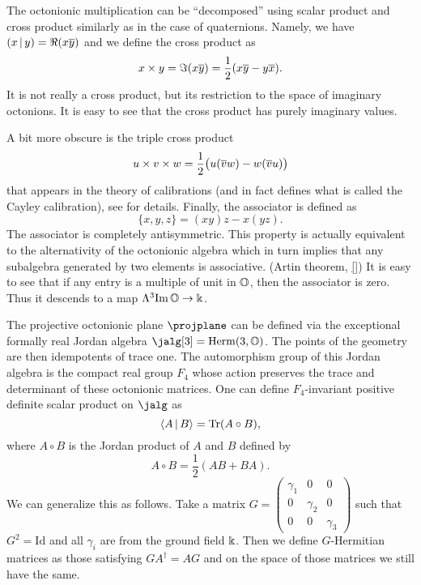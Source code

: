 The octonionic multiplication  can be ``decomposed'' using scalar product and cross product similarly  as in the case of quaternions. Namely, we have $\left( x \,|\, y \right) = \Re( x\overline{y})$ and we define the cross product as \[x \times y = \Im (x\overline{y}) = \frac{1}{2}( x\overline{y} - y\overline{x}).\] It is not really a cross product, but its restriction to the space of imaginary octonions. It is easy to see that the cross product has purely imaginary values.


A bit more obscure is the triple cross product 
\[
u \times v \times w = \frac{1}{2}\bigl( u(\overline{v}w) - w(\overline{v}u) \bigr)
\]
that appears in the theory of calibrations (and in fact defines what is called the Cayley calibration), see \cite{harvey, salamon} for details. Finally, the associator is defined as
\[
\{ x,y,z \} = (xy)z - x(yz).
\]
The associator is completely antisymmetric. This property is actually equivalent to the alternativity of the octonionic algebra which in turn implies that any subalgebra generated by two elements is associative. (Artin theorem, \ref{}) It is easy to see that if any entry is a multiple of unit in $\mathbb{O}$, then the associator is zero. Thus it descends to a map $\Lambda^3 \mathrm{Im}\, \mathbb{O} \to \Bbbk$.

The projective octonionic plane $\projplane$ can be defined via the exceptional formally real Jordan algebra $\jalg[3] = \mathrm{Herm}(3,\octo)$. The points of the geometry are then idempotents of trace one. The automorphism group of this Jordan algebra is the compact real group $F_4$ whose action preserves the trace and determinant of these octonionic matrices. One can define $F_4$-invariant positive definite scalar product on $\jalg$ as
\[
 \langle A\,|\, B \rangle = \mathrm{Tr}(A \circ B),
\]
where $A \circ B$ is the Jordan product of $A$ and $B$ defined by
\[
 A \circ B = \frac{1}{2} \left( AB + BA \right).
\]
We can generalize this as follows. Take a matrix $G=\begin{pmatrix} \gamma_1 & 0 & 0 \\ 0 & \gamma_2 & 0 \\ 0 & 0 & \gamma_3\end{pmatrix}$ such that $G^2 = \mathrm{Id}$ and all $\gamma_i$ are from the ground field $\Bbbk$. Then we define $G$-Hermitian matrices as those satisfying $GA^\dagger = AG$ and on the space of those matrices we still have the same.


